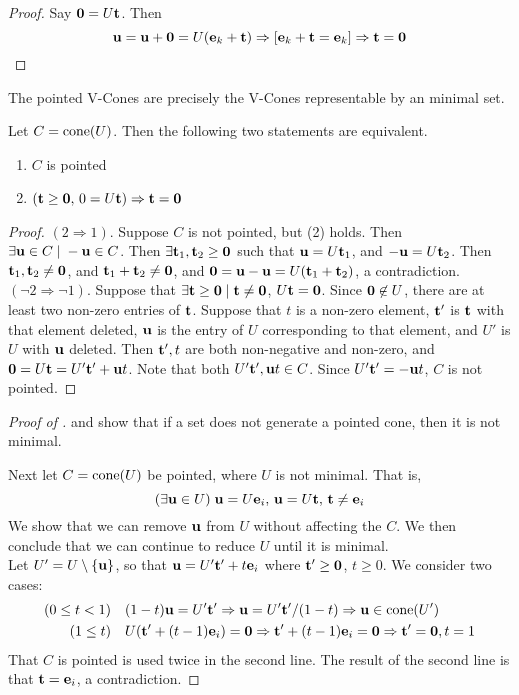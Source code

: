 \begin{proof}
	Say $\mathbf{0} = U\mathbf{t}$.  Then
	\[ \mathbf{u} = \mathbf{u}+\mathbf{0} = U(\mathbf{e}_k+\mathbf{t}) \Rightarrow [\mathbf{e}_k+\mathbf{t} = \mathbf{e}_k] \Rightarrow \mathbf{t} = \mathbf{0} \]
\end{proof}

\begin{Prop}\label{minimal_vcones}
	The pointed V-Cones are precisely the V-Cones representable by an minimal set.
\end{Prop}

\begin{Lemma}\label{pointed_independence}
	Let $C = \operatorname{cone}(U)$.  Then the following two statements are equivalent.
	\begin{enumerate}
		\item $C$ is pointed
		\item $(\mathbf{t}\geq\mathbf{0},\,0=U\mathbf{t})\Rightarrow \mathbf{t}=\mathbf{0}$
	\end{enumerate}
\end{Lemma}

\begin{proof}
	$(2\Rightarrow 1)$.  Suppose $C$ is not pointed, but (2) holds.  Then $\exists \mathbf{u}\in C\;|\; -\mathbf{u}\in C$.  Then $\exists \mathbf{t}_1,\mathbf{t}_2 \geq \mathbf{0}$ such that $\mathbf{u} = U\mathbf{t}_1$, and $-\mathbf{u} = U\mathbf{t}_2$.  Then $\mathbf{t}_1,\mathbf{t}_2 \neq \mathbf{0}$, and $\mathbf{t}_1 + \mathbf{t}_2 \neq \mathbf{0}$, and $\mathbf{0} = \mathbf{u}-\mathbf{u} = U(\mathbf{t}_1+\mathbf{t}_2)$, a contradiction.\\
	$(\neg 2\Rightarrow \neg 1)$.  Suppose that $\exists \mathbf{t}\geq\mathbf{0}\;|\;\mathbf{t}\neq\mathbf{0}$, $U\mathbf{t}=\mathbf{0}$.  Since $\mathbf{0}\not\in U$, there are at least two non-zero entries of $\mathbf{t}$.  Suppose that $t$ is a non-zero element, $\mathbf{t}'$ is $\mathbf{t}$ with that element deleted, $\mathbf{u}$ is the entry of $U$ corresponding to that element, and $U'$ is $U$ with $\mathbf{u}$ deleted.  Then $\mathbf{t}',t$ are both non-negative and non-zero, and $\mathbf{0} = U\mathbf{t} = U'\mathbf{t}' + \mathbf{u} t$.  Note that both $U'\mathbf{t}',\mathbf{u} t \in C$.  Since $U'\mathbf{t}' = -\mathbf{u} t$, $C$ is not pointed.
\end{proof}

\begin{proof}[Proof of ]
	 and  show that if a set does not generate a pointed cone, then it is not minimal.

	Next let $C = \operatorname{cone}(U)$ be pointed, where $U$ is not minimal.  That is,
	\[(\exists \mathbf{u}\in U)\; \mathbf{u}=U\mathbf{e}_i,\, \mathbf{u} = U\mathbf{t},\, \mathbf{t}\neq\mathbf{e}_i \]
	We show that we can remove $\mathbf{u}$ from $U$ without affecting the $C$.  We then conclude that we can continue to reduce $U$ until it is minimal.\\
	Let $U' = U\setminus\left\{\mathbf{u}\right\}$, so that $\mathbf{u} = U'\mathbf{t}' + t\mathbf{e}_i$ where $\mathbf{t}'\geq\mathbf{0}$, $t\geq 0$.  We consider two cases:
	\begin{align*}
		(0\leq t<1) & \quad (1-t)\mathbf{u} = U'\mathbf{t}' \Rightarrow \mathbf{u} = U'\mathbf{t}'/(1-t) \Rightarrow \mathbf{u} \in \operatorname{cone}(U') \\
		(1 \leq t)  & \quad U(\mathbf{t}'+(t-1)\mathbf{e}_i)=\mathbf{0} \Rightarrow \mathbf{t}'+(t-1)\mathbf{e}_i=\mathbf{0} \Rightarrow \mathbf{t}'=\mathbf{0},t=1
	\end{align*}
	That $C$ is pointed is used twice in the second line.  The result of the second line is that $\mathbf{t}=\mathbf{e}_i$, a contradiction.
\end{proof}

